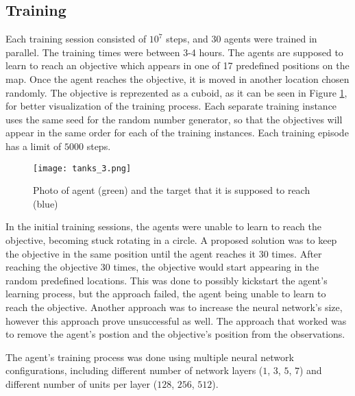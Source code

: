 \subsection{Training} \label{static_target:training}

Each training session consisted of $10^7$ steps, and 30 agents were trained in parallel. The training times were between 3-4 hours. The agents are supposed to learn to reach an objective which appears in one of 17 predefined positions on the map. Once the agent reaches the objective, it is moved in another location chosen randomly. The objective is reprezented as a cuboid, as it can be seen in Figure \ref{photo:tank_chasing_target}, for better visualization of the training process. Each separate training instance uses the same seed for the random number generator, so that the objectives will appear in the same order for each of the training instances. Each training episode has a limit of $5000$ steps.

\begin{figure}
    \begin{center}
        \texttt{[image: tanks\_3.png]}
        \caption{Photo of agent (green) and the target that it is supposed to reach (blue)}
        \label{photo:tank_chasing_target}
    \end{center}
\end{figure}

In the initial training sessions, the agents were unable to learn to reach the objective, becoming stuck rotating in a circle. A proposed solution was to keep the objective in the same position until the agent reaches it 30 times. After reaching the objective 30 times, the objective would start appearing in the random predefined locations. This was done to possibly kickstart the agent's learning process, but the approach failed, the agent being unable to learn to reach the objective. Another approach was to increase the neural network's size, however this approach prove unsuccessful as well. The approach that worked was to remove the agent's postion and the objective's position from the observations. 

The agent's training process was done using multiple neural network configurations, including different number of network layers ($1$, $3$, $5$, $7$) and different number of units per layer ($128$, $256$, $512$).

